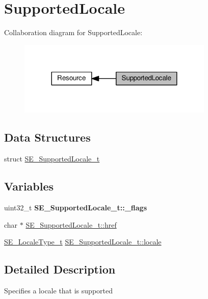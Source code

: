\hypertarget{group__SupportedLocale}{}\section{Supported\+Locale}
\label{group__SupportedLocale}
Collaboration diagram for Supported\+Locale\+:\nopagebreak
\begin{figure}[H]
\begin{center}
\leavevmode
\includegraphics[width=264pt]{group__SupportedLocale}
\end{center}
\end{figure}
\subsection*{Data Structures}
\begin{DoxyCompactItemize}
\item 
struct \hyperlink{structSE__SupportedLocale__t}{S\+E\+\_\+\+Supported\+Locale\+\_\+t}
\end{DoxyCompactItemize}
\subsection*{Variables}
\begin{DoxyCompactItemize}
\item 
\mbox{\label{group__SupportedLocale_gac955f83101f39a331dd4c5526896d0e3}} 
uint32\+\_\+t {\bfseries S\+E\+\_\+\+Supported\+Locale\+\_\+t\+::\+\_\+flags}
\item 
char $\ast$ \hyperlink{group__SupportedLocale_ga4dceab07e3e7dc69ca2393ffea2dc145}{S\+E\+\_\+\+Supported\+Locale\+\_\+t\+::href}
\item 
\hyperlink{group__LocaleType_gafbd2b639ff2cebd36ad75759203ee20c}{S\+E\+\_\+\+Locale\+Type\+\_\+t} \hyperlink{group__SupportedLocale_ga1fc9258fccc19fa907b3d8cd28b26465}{S\+E\+\_\+\+Supported\+Locale\+\_\+t\+::locale}
\end{DoxyCompactItemize}


\subsection{Detailed Description}
Specifies a locale that is supported 


